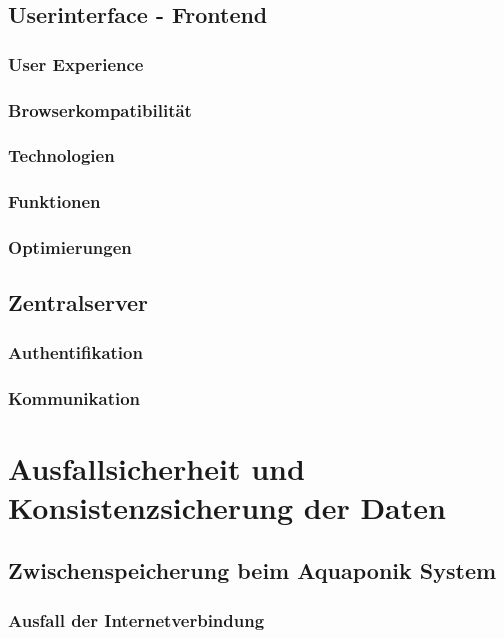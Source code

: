 \documentclass[12pt]{article}
\begin{document}
\subsection{Userinterface - Frontend}
\subsubsection{User Experience}
\subsubsection{Browserkompatibilität}
\subsubsection{Technologien}
\subsubsection{Funktionen}
\subsubsection{Optimierungen}
\subsection{Zentralserver}
\subsubsection{Authentifikation}
\subsubsection{Kommunikation}
%

\newpage %
\section{Ausfallsicherheit und Konsistenzsicherung der Daten}
%

\subsection{Zwischenspeicherung beim Aquaponik System}
%

\subsubsection{Ausfall der Internetverbindung}
%
\end{document}
